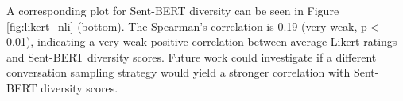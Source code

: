 \documentclass[11pt]{article}
\begin{document}
A corresponding plot for Sent-BERT diversity can be seen in Figure \ref{fig:likert_nli} (bottom).  The Spearman's correlation is 0.19 (very weak, p$<$0.01), indicating a very weak positive correlation between  average Likert ratings and Sent-BERT diversity scores. 
Future work could investigate if a different conversation sampling strategy would yield a stronger correlation with 
Sent-BERT diversity scores.
\end{document}
